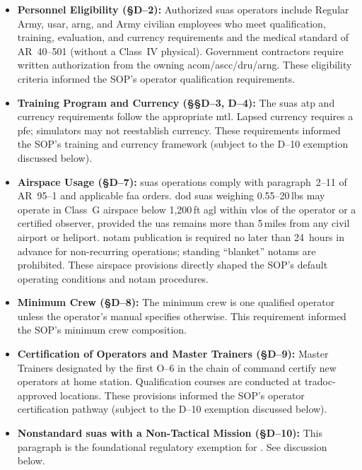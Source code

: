         \begin{itemize}
            \item \textbf{Personnel Eligibility ({\S}D--2):} Authorized \ac{suas} operators include Regular Army, \ac{usar}, \ac{arng}, and Army civilian employees who meet qualification, training, evaluation, and currency requirements and the medical standard of AR~40--501 (without a Class~IV physical).  Government contractors require written authorization from the owning \ac{acom}/\ac{ascc}/\ac{dru}/\ac{arng}.  These eligibility criteria informed the SOP's operator qualification requirements.
            \item \textbf{Training Program and Currency ({\S\S}D--3, D--4):} The \ac{suas} \ac{atp} and currency requirements follow the appropriate \ac{mtl}.  Lapsed currency requires a \ac{pfe}; simulators may not reestablish currency.  These requirements informed the SOP's training and currency framework (subject to the D--10 exemption discussed below).
            \item \textbf{Airspace Usage ({\S}D--7):} \ac{suas} operations comply with paragraph~2--11 of AR~95--1 and applicable \ac{faa} orders.  \ac{dod} \ac{suas} weighing 0.55--20\,lbs may operate in Class~G airspace below 1,200\,ft \ac{agl} within \ac{vlos} of the operator or a certified observer, provided the \ac{uas} remains more than 5\,miles from any civil airport or heliport.  \ac{notam} publication is required no later than 24~hours in advance for non-recurring operations; standing ``blanket'' \ac{notam}s are prohibited.  These airspace provisions directly shaped the SOP's default operating conditions and \ac{notam} procedures.
            \item \textbf{Minimum Crew ({\S}D--8):} The minimum crew is one qualified operator unless the operator's manual specifies otherwise.  This requirement informed the SOP's minimum crew composition.
            \item \textbf{Certification of Operators and Master Trainers ({\S}D--9):} Master Trainers designated by the first O--6 in the chain of command certify new operators at home station.  Qualification courses are conducted at \ac{tradoc}-approved locations.  These provisions informed the SOP's operator certification pathway (subject to the D--10 exemption discussed below).
            \item \textbf{Nonstandard \ac{suas} with a Non-Tactical Mission ({\S}D--10):} This paragraph is the foundational regulatory exemption for \projectmars{}.  See discussion below.
        \end{itemize}

